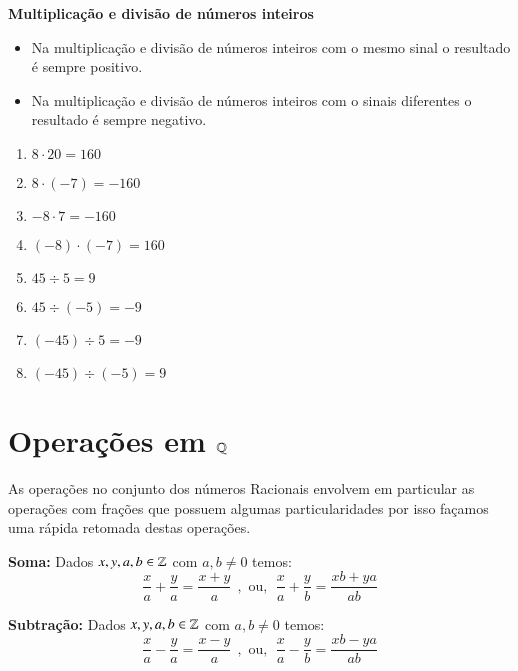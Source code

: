  \textbf{Multiplicação e divisão de números inteiros}

  \begin{itemize}
   \item Na multiplicação e divisão de números inteiros com o mesmo sinal o resultado é sempre positivo.
   \item Na multiplicação e divisão de números inteiros com o sinais diferentes o resultado é sempre negativo.
  \end{itemize}

  \begin{multicols}{2}
  \begin{enumerate}[1)]
   \item $8 \cdot 20= 160$
   \item $8 \cdot (-7)= -160$
   \item $-8 \cdot 7= -160$
   \item $(-8) \cdot (-7)= 160$
   \item $45 \div 5= 9$
   \item $45 \div (-5)= -9$
   \item $(-45) \div 5= -9$
   \item $(-45) \div (-5)= 9$
  \end{enumerate}
  \end{multicols}



 \section{Operações em \texorpdfstring{$\mathbb{Q}$}{Q}}

 As operações no conjunto dos números Racionais envolvem em particular as operações com frações que possuem algumas particularidades por isso façamos uma rápida retomada destas operações.

 \vskip0.3cm

 \colorbox{azul}{
 \begin{minipage}{0.9\linewidth}
 \begin{center}
  \textbf{Soma:} Dados $x, y, a, b \in \mathbb{Z}$ com $a, b \neq 0$ temos:
 \[\frac{x}{a} + \frac{y}{a}= \frac{x+y}{a} \ \ , \text{ ou}, \ \
  \frac{x}{a} + \frac{y}{b}= \frac{xb + ya}{ab} \]
 \end{center}
 \end{minipage}}

 \vskip0.3cm

 \colorbox{azul}{
 \begin{minipage}{0.9\linewidth}
 \begin{center}
  \textbf{Subtração:} Dados $x, y, a, b \in \mathbb{Z}$ com $a, b \neq 0$ temos:
 \[\frac{x}{a} - \frac{y}{a}= \frac{x-y}{a} \ \ , \text{ ou}, \ \
 \frac{x}{a} - \frac{y}{b}= \frac{xb - ya}{ab} \]
 \end{center}
 \end{minipage}}

